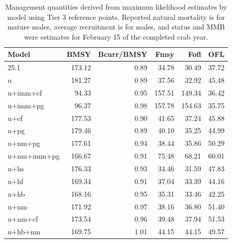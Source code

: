\documentclass[
]{article}
\begin{document}
\begin{landscape}

\begin{table}

\caption{\label{tab:stepchange}\label{tab:stepchange} Management quantities derived from maximum likelihood estimates by model using Tier 3 reference points. Reported natural mortality is for mature males, average recruitment is for males, and status and MMB were estimates for February 15 of the completed crab year.}
\centering
\begin{tabular}[t]{l|r|r|r|r|r}
\hline
Model & BMSY & Bcurr/BMSY & Fmsy & Fofl & OFL\\
\hline
25.1 & 173.12 & 0.89 & 34.78 & 30.49 & 37.72\\
\hline
u & 181.27 & 0.89 & 37.56 & 32.92 & 45.48\\
\hline
u+imm+cf & 94.33 & 0.95 & 157.51 & 149.34 & 36.42\\
\hline
u+imm+pg & 96.37 & 0.98 & 157.78 & 154.63 & 35.75\\
\hline
u+cf & 177.53 & 0.90 & 41.65 & 37.24 & 45.88\\
\hline
u+pg & 179.46 & 0.89 & 40.10 & 35.25 & 44.99\\
\hline
u+nm+pg & 177.61 & 0.94 & 38.44 & 35.86 & 50.29\\
\hline
u+nm+imm+pg & 166.67 & 0.91 & 75.48 & 68.21 & 60.01\\
\hline
u+hs & 176.33 & 0.93 & 34.46 & 31.59 & 47.83\\
\hline
u+hf & 169.34 & 0.91 & 37.04 & 33.39 & 44.16\\
\hline
u+hb & 168.16 & 0.95 & 35.31 & 33.46 & 42.25\\
\hline
u+nm & 171.92 & 0.97 & 38.16 & 36.80 & 51.40\\
\hline
u+nm+cf & 173.54 & 0.96 & 39.48 & 37.94 & 51.53\\
\hline
u+hb+nm & 169.75 & 1.01 & 44.15 & 44.15 & 49.57\\
\hline
\end{tabular}
\end{table}

\end{landscape}

\newpage

\newpage
\end{document}
